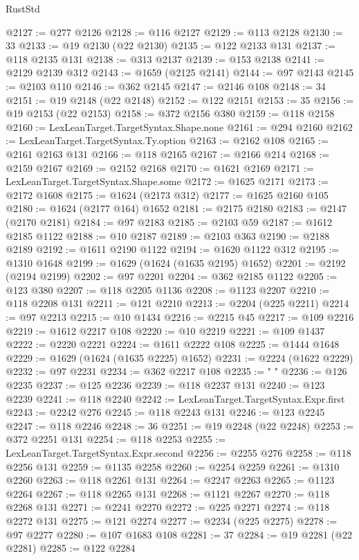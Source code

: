 \begin{lexlean}{RustStd}
\begin{coremodule}
@2127 := @277 @2126
@2128 := @116 @2127
@2129 := @113 @2128
@2130 := 33
@2133 := @19 @2130 (@22 @2130)
@2135 := @122 @2133 @131
@2137 := @118 @2135 @131
@2138 := @313 @2137
@2139 := @153 @2138
@2141 := @2129 @2139 @312
@2143 := @1659 (@2125 @2141)
@2144 := @97 @2143
@2145 := @2103 @110
@2146 := @362 @2145
@2147 := @2146 @108
@2148 := 34
@2151 := @19 @2148 (@22 @2148)
@2152 := @122 @2151
@2153 := 35
@2156 := @19 @2153 (@22 @2153)
@2158 := @372 @2156 @380
@2159 := @118 @2158
@2160 := LexLeanTarget.TargetSyntax.Shape.none
@2161 := @294 @2160
@2162 := LexLeanTarget.TargetSyntax.Ty.option
@2163 := @2162 @108
@2165 := @2161 @2163 @131
@2166 := @118 @2165
@2167 := @2166 @214
@2168 := @2159 @2167
@2169 := @2152 @2168
@2170 := @1621 @2169
@2171 := LexLeanTarget.TargetSyntax.Shape.some
@2172 := @1625 @2171
@2173 := @2172 @1608
@2175 := @1624 (@2173 @312)
@2177 := @1625 @2160 @105
@2180 := @1624 (@2177 @164) @1652
@2181 := @2175 @2180
@2183 := @2147 (@2170 @2181)
@2184 := @97 @2183
@2185 := @2103 @59
@2187 := @1612 @2185 @1122
@2188 := @10 @2187
@2189 := @2103 @363
@2190 := @2188 @2189
@2192 := @1611 @2190 @1122
@2194 := @1620 @1122 @312
@2195 := @1310 @1648
@2199 := @1629 (@1624 (@1635 @2195) @1652)
@2201 := @2192 (@2194 @2199)
@2202 := @97 @2201
@2204 := @362 @2185 @1122
@2205 := @123 @380
@2207 := @118 @2205 @1136
@2208 := @1123 @2207
@2210 := @118 @2208 @131
@2211 := @121 @2210
@2213 := @2204 (@225 @2211)
@2214 := @97 @2213
@2215 := @10 @1434
@2216 := @2215 @45
@2217 := @109 @2216
@2219 := @1612 @2217 @108
@2220 := @10 @2219
@2221 := @109 @1437
@2222 := @2220 @2221
@2224 := @1611 @2222 @108
@2225 := @1444 @1648
@2229 := @1629 (@1624 (@1635 @2225) @1652)
@2231 := @2224 (@1622 @2229)
@2232 := @97 @2231
@2234 := @362 @2217 @108
@2235 := "            "
@2236 := @126 @2235
@2237 := @125 @2236
@2239 := @118 @2237 @131
@2240 := @123 @2239
@2241 := @118 @2240
@2242 := LexLeanTarget.TargetSyntax.Expr.first
@2243 := @2242 @276
@2245 := @118 @2243 @131
@2246 := @123 @2245
@2247 := @118 @2246
@2248 := 36
@2251 := @19 @2248 (@22 @2248)
@2253 := @372 @2251 @131
@2254 := @118 @2253
@2255 := LexLeanTarget.TargetSyntax.Expr.second
@2256 := @2255 @276
@2258 := @118 @2256 @131
@2259 := @1135 @2258
@2260 := @2254 @2259
@2261 := @1310 @2260
@2263 := @118 @2261 @131
@2264 := @2247 @2263
@2265 := @1123 @2264
@2267 := @118 @2265 @131
@2268 := @1121 @2267
@2270 := @118 @2268 @131
@2271 := @2241 @2270
@2272 := @225 @2271
@2274 := @118 @2272 @131
@2275 := @121 @2274
@2277 := @2234 (@225 @2275)
@2278 := @97 @2277
@2280 := @107 @1683 @108
@2281 := 37
@2284 := @19 @2281 (@22 @2281)
@2285 := @122 @2284

\end{coremodule}
\end{lexlean}
